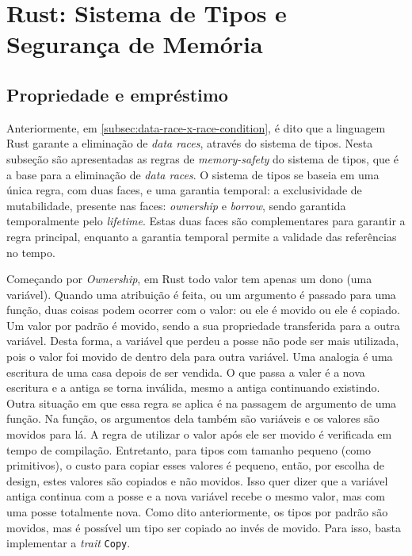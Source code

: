 \section{Rust: Sistema de Tipos e Segurança de Memória}

\subsection{Propriedade e empréstimo}
\label{subsec:types_guarantee}

Anteriormente, em \ref{subsec:data-race-x-race-condition}, é dito que a linguagem Rust garante a eliminação de \textit{data races}, através do sistema de tipos. Nesta subseção são apresentadas as regras de \textit{memory-safety} do sistema de tipos, que é a base para a eliminação de \textit{data races}. O sistema de tipos se baseia em uma única regra, com duas faces, e uma garantia temporal: a exclusividade de mutabilidade, presente nas faces: \textit{ownership} e \textit{borrow}, sendo garantida temporalmente pelo \textit{lifetime}. Estas duas faces são complementares para garantir a regra principal, enquanto a garantia temporal permite a validade das referências no tempo.

Começando por \textit{Ownership}, em Rust todo valor tem apenas um dono (uma variável). Quando uma atribuição é feita, ou um argumento é passado para uma função, duas coisas podem ocorrer com o valor: ou ele é movido ou ele é copiado. Um valor por padrão é movido, sendo a sua propriedade transferida para a outra variável. Desta forma, a variável que perdeu a posse não pode ser mais utilizada, pois o valor foi movido de dentro dela para outra variável. Uma analogia é uma escritura de uma casa depois de ser vendida. O que passa a valer é a nova escritura e a antiga se torna inválida, mesmo a antiga continuando existindo. Outra situação em que essa regra se aplica é na passagem de argumento de uma função. Na função, os argumentos dela também são variáveis e os valores são movidos para lá. A regra de utilizar o valor após ele ser movido é verificada em tempo de compilação. Entretanto, para tipos com tamanho pequeno (como primitivos), o custo para copiar esses valores é pequeno, então, por escolha de design, estes valores são copiados e não movidos. Isso quer dizer que a variável antiga continua com a posse e a nova variável recebe o mesmo valor, mas com uma posse totalmente nova. Como dito anteriormente, os tipos por padrão são movidos, mas é possível um tipo ser copiado ao invés de movido. Para isso, basta implementar a \textit{trait} \texttt{Copy}.

